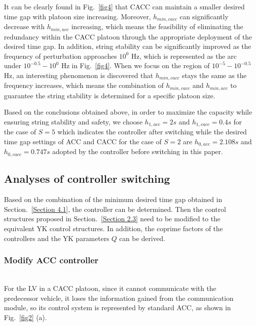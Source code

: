 \documentclass[journal]{IEEEtran}
\begin{document}
It can be clearly found in Fig.~\ref{fig4} that CACC can maintain a smaller desired time gap with platoon size increasing. Moreover, $h_{min,cacc}$ can significantly decrease with $h_{min,acc}$ increasing, which means the feasibility of eliminating the redundancy within the CACC platoon through the appropriate deployment of the desired time gap. In addition, string stability can be significantly improved as the frequency of perturbation approaches $10^0$ Hz, which is represented as the arc under $10^{-0.5} - 10^0$ Hz in Fig.~\ref{fig4}. When we focus on the region of $10^{-5} - 10^{-0.5}$ Hz, an interesting phenomenon is discovered that $h_{min,cacc}$ stays the same as the frequency increases, which means the combination of $h_{min,cacc}$ and $h_{min,acc}$ to guarantee the string stability is determined for a specific platoon size.

Based on the conclusions obtained above, in order to maximize the capacity while ensuring string stability and safety, we choose $h_{1,acc}=2s$ and $h_{1,cacc}=0.4s$ for the case of $S=5$ which indicates the controller after switching while the desired time gap settings of ACC and CACC for the case of $S=2$ are $h_{0,acc}=2.108s$ and $h_{0,cacc}=0.747s$ adopted by the controller before switching in this paper.

\subsection{Analyses of controller switching}
\label{Section 4.2}

Based on the combination of the minimum desired time gap obtained in Section.~\ref{Section 4.1}, the controller can be determined. Then the control structures proposed in Section.~\ref{Section 2.3} need to be modified to the equivalent YK control structures. In addition, the coprime factors of the controllers and the YK parameters $Q$ can be derived.

\subsubsection{Modify ACC controller}
\label{Section 4.2.1}
~\\

For the LV in a CACC platoon, since it cannot communicate with the predecessor vehicle, it loses the information gained from the communication module, so its control system is represented by standard ACC, as shown in Fig.~\ref{fig2} (a).
\end{document}
